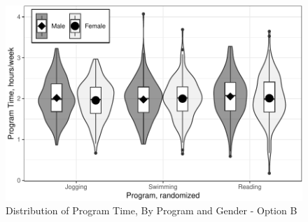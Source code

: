 \documentclass[
]{article}
\begin{document}
\begin{figure}[hb]

\includegraphics{Appendix_ex_weightloss_files/figure-latex/unnamed-chunk-47-1} \hfill{}

\caption{Distribution of Program Time, By Program and Gender - Option B}\label{fig:unnamed-chunk-47}
\end{figure}

\clearpage
\end{document}
